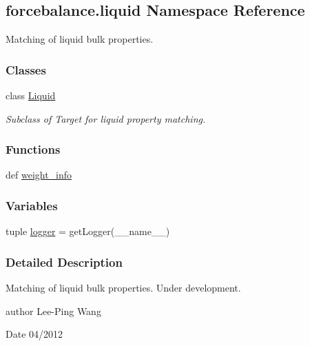 \hypertarget{namespaceforcebalance_1_1liquid}{\subsection{forcebalance.\-liquid Namespace Reference}
\label{namespaceforcebalance_1_1liquid}
}


Matching of liquid bulk properties.  


\subsubsection*{Classes}
\begin{DoxyCompactItemize}
\item 
class \hyperlink{classforcebalance_1_1liquid_1_1Liquid}{Liquid}
\begin{DoxyCompactList}\small\item\em Subclass of Target for liquid property matching. \end{DoxyCompactList}\end{DoxyCompactItemize}
\subsubsection*{Functions}
\begin{DoxyCompactItemize}
\item 
def \hyperlink{namespaceforcebalance_1_1liquid_a6f7d54263236f8788c319aee86b460b6}{weight\-\_\-info}
\end{DoxyCompactItemize}
\subsubsection*{Variables}
\begin{DoxyCompactItemize}
\item 
tuple \hyperlink{namespaceforcebalance_1_1liquid_a8c47ecb4fda6a9bccb24ef292da2ec57}{logger} = get\-Logger(\-\_\-\-\_\-name\-\_\-\-\_\-)
\end{DoxyCompactItemize}


\subsubsection{Detailed Description}
Matching of liquid bulk properties. Under development.

author Lee-\/\-Ping Wang \begin{DoxyDate}{Date}
04/2012 
\end{DoxyDate}


